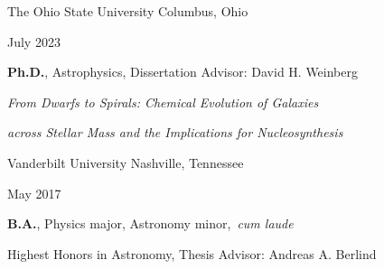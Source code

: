 \documentclass[cv.tex]{subfiles}
\begin{document}
{\color{themecolor}\large The Ohio State University}
\hfill
Columbus, Ohio
\par\noindent
\parbox{0.18\textwidth}{%
	\raggedleft
	July 2023 \par
	\null \par
	\null
}
\hspace{1mm}
\parbox{0.8\textwidth}{%
	\textbf{Ph.D.}, Astrophysics, Dissertation Advisor: David H. Weinberg
	\par
	\textit{From Dwarfs to Spirals: Chemical Evolution of
	Galaxies} \par
	\textit{across Stellar Mass and the Implications for Nucleosynthesis} \par
}
\vspace{2mm}
\par\noindent
{\color{themecolor}\large Vanderbilt University}
\hfill
Nashville, Tennessee
\par\noindent
\parbox{0.18\textwidth}{%
	\raggedleft
	May 2017 \par
	\null
}
\hspace{1mm}
\parbox{0.8\textwidth}{%
	\vspace{1mm}
	\textbf{B.A.}, Physics major, Astronomy minor,~\textit{cum laude} \par
	Highest Honors in Astronomy, Thesis Advisor: Andreas A. Berlind
}
\end{document}
